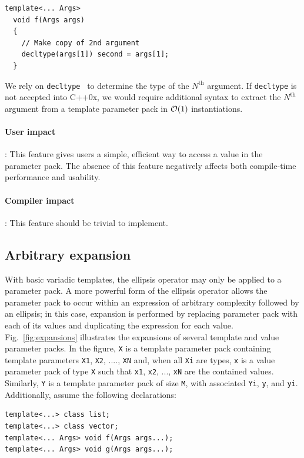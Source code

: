 \documentclass{article}
\begin{document}
\begin{verbatim}
template<... Args>
  void f(Args args)
  {
    // Make copy of 2nd argument
    decltype(args[1]) second = args[1];
  }
\end{verbatim}

We rely on \texttt{decltype}~\cite{JarviStroustrup04} to determine the
type of the $N^{\text{th}}$ argument. If \texttt{decltype} is not
accepted into C++0x, we would require additional syntax to extract the
$N^{\text{th}}$ argument from a template parameter pack in ${\cal
  O}(1)$ instantiations.

\paragraph{User impact}: This feature gives users a simple, efficient
way to access a value in the parameter pack. The absence of this
feature negatively affects both compile-time performance and usability.

\paragraph{Compiler impact}: This feature should be trivial to
implement.

\subsection{Arbitrary expansion}
\label{sec:arb-expansion}
With basic variadic templates, the ellipsis operator may only be
applied to a parameter pack. A more powerful form of the ellipsis
operator allows the parameter pack to occur within an expression of
arbitrary complexity followed by an ellipsis; in this case, expansion
is performed by replacing parameter pack with each of its values and
duplicating the expression for each value. Fig.~\ref{fig:expansions}
illustrates the expansions of several template and value parameter
packs. In the figure, \texttt{X} is a template parameter pack
containing template parameters \texttt{X1}, \texttt{X2}, ....,
\texttt{XN} and, when all \texttt{Xi} are types, \texttt{x} is a value
parameter pack of type \texttt{X} such that \texttt{x1}, \texttt{x2},
..., \texttt{xN} are the contained values. Similarly, \texttt{Y} is a
template parameter pack of size \texttt{M}, with associated
\texttt{Yi}, \texttt{y}, and \texttt{yi}. Additionally, assume the
following declarations:
\begin{verbatim}
template<...> class list;
template<...> class vector;
template<... Args> void f(Args args...);
template<... Args> void g(Args args...);
\end{verbatim}
\end{document}
